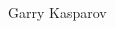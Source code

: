 \documentclass[notes,12pt, aspectratio=169]{beamer}
\begin{document}
\begin{frame}{ }
\begin{columns}[T]
\begin{column}{.49\textwidth}
	\hspace{1.5cm}
\mbox{ }

\hspace{1.9cm} Garry Kasparov
\end{column}
\hfill
\begin{column}{.49\textwidth}
\end{column}
\end{columns}
\end{frame}
\end{document}
